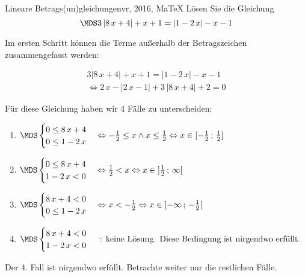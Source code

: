  \providecommand{\MoIl}[1][]{\mbox{}#1]\mathopen{}} 
 \providecommand{\MoIr}[1][]{#1[\mbox{}} 
 \providecommand{\MIntvlSep}{;} 
 \providecommand{\MElSetSep}{\, ; \, } 
 \begin{MAufgabe}{Lineare Betrags(un)gleichungen}{vr, 2016, MaTeX}
L\"osen Sie die Gleichung
$$
 \MDS 3\left| 8\, x + 4 \right|+x + 1=  \left| 1 - 2\, x \right|  - x - 1
$$  

\ifLsg\MLoesung

Im ersten Schritt k\"onnen die Terme au\ss{}erhalb der Betragszeichen zusammengefasst werden:

\begin{align*} 
 3\left| 8\, x + 4 \right|+x + 1=  \left| 1 - 2\, x \right|  - x - 1\\ 
\Leftrightarrow2\, x - \left|2\, x - 1\right| + 3\, \left|8\, x + 4\right| + 2= 0 
 \end{align*}

F\"ur diese Gleichung haben wir 4 F\"alle zu unterscheiden: 
\begin{enumerate}
\item $ \MDS 
\begin{cases} 
 0 \leq 8\, x + 4\\ 
0 \leq 1 - 2\, x
 \end{cases}
\Leftrightarrow - \frac{1}{2} \leq x \wedge x \leq \frac{1}{2}\Leftrightarrow x \in [ - \frac{1}{2} \, \MIntvlSep \, \frac{1}{2}]$ 
\item $ \MDS 
\begin{cases} 
 0 \leq 8\, x + 4\\ 
1 - 2\, x < 0
 \end{cases}
\Leftrightarrow \frac{1}{2} < x\Leftrightarrow x \in \MoIl  \frac{1}{2} \, \MIntvlSep \, \infty\MoIr $ 
\item $ \MDS 
\begin{cases} 
 8\, x + 4 < 0\\ 
0 \leq 1 - 2\, x
 \end{cases}
\Leftrightarrow x < - \frac{1}{2}\Leftrightarrow x \in \MoIl  -\infty \, \MIntvlSep \, - \frac{1}{2}\MoIr $ 
\item $ \MDS 
\begin{cases} 
 8\, x + 4 < 0\\ 
1 - 2\, x < 0
 \end{cases}
 \mbox{ : keine L\"osung. Diese Bedingung ist nirgendwo erf\"ullt.}$ 
\end{enumerate} 
Der 4. Fall ist nirgendwo erf\"ullt. Betrachte weiter nur die restlichen F\"alle.
 

\end{MAufgabe}
